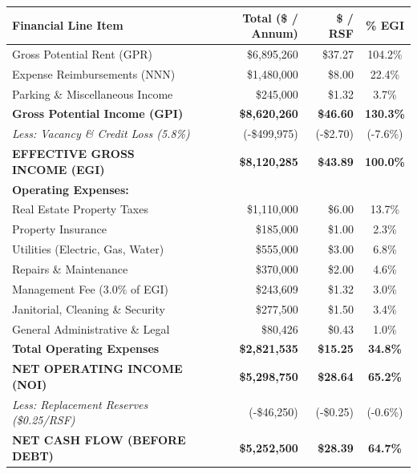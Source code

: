 \documentclass[10pt,a4paper]{scrartcl}
\begin{document}
\vspace{2pt}
\begin{center}
\scriptsize
{}
\begin{tabularx}{\textwidth}{@{} L r r c @{}}
\toprule
{}
{\color{white}\textbf{Financial Line Item}} & {\color{white}\textbf{Total (\$ / Annum)}} & {\color{white}\textbf{\$ / RSF}} & {\color{white}\textbf{\% EGI}} \\
\midrule
Gross Potential Rent (GPR) & \$6,895,260 & \$37.27 & 104.2\% \\
Expense Reimbursements (NNN) & \$1,480,000 & \$8.00 & 22.4\% \\
Parking \& Miscellaneous Income & \$245,000 & \$1.32 & 3.7\% \\
\midrule
\textbf{Gross Potential Income (GPI)} & \textbf{\$8,620,260} & \textbf{\$46.60} & \textbf{130.3\%} \\
\textit{Less: Vacancy \& Credit Loss (5.8\%)} & (-\$499,975) & (-\$2.70) & (-7.6\%) \\
\midrule
{}
\textbf{\color{navyprimary}EFFECTIVE GROSS INCOME (EGI)} & \textbf{\$8,120,285} & \textbf{\$43.89} & \textbf{100.0\%} \\
\midrule
\textbf{Operating Expenses:} & & & \\
\quad Real Estate Property Taxes & \$1,110,000 & \$6.00 & 13.7\% \\
\quad Property Insurance & \$185,000 & \$1.00 & 2.3\% \\
\quad Utilities (Electric, Gas, Water) & \$555,000 & \$3.00 & 6.8\% \\
\quad Repairs \& Maintenance & \$370,000 & \$2.00 & 4.6\% \\
\quad Management Fee (3.0\% of EGI) & \$243,609 & \$1.32 & 3.0\% \\
\quad Janitorial, Cleaning \& Security & \$277,500 & \$1.50 & 3.4\% \\
\quad General Administrative \& Legal & \$80,426 & \$0.43 & 1.0\% \\
\midrule
\textbf{Total Operating Expenses} & \textbf{\$2,821,535} & \textbf{\$15.25} & \textbf{34.8\%} \\
\midrule
{}
\textbf{\color{navyprimary}NET OPERATING INCOME (NOI)} & \textbf{\$5,298,750} & \textbf{\$28.64} & \textbf{65.2\%} \\
\textit{Less: Replacement Reserves (\$0.25/RSF)} & (-\$46,250) & (-\$0.25) & (-0.6\%) \\
\midrule
{}
{\color{white}\textbf{NET CASH FLOW (BEFORE DEBT)}} & {\color{white}\textbf{\$5,252,500}} & {\color{white}\textbf{\$28.39}} & {\color{white}\textbf{64.7\%}} \\
\bottomrule
\end{tabularx}
\end{center}
\end{document}
